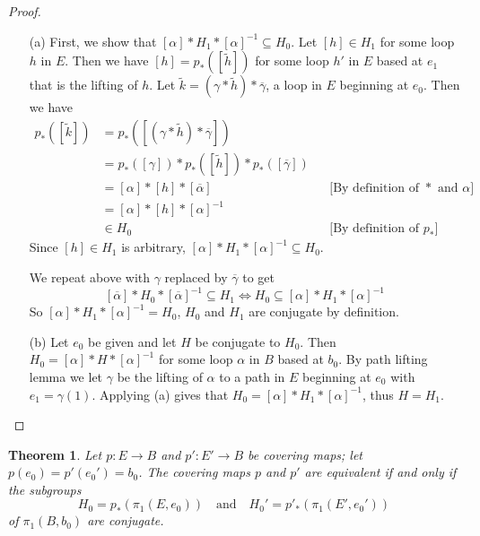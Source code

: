 \documentclass{amsart}
\newtheorem{theorem}{Theorem}[section]
\theoremstyle{definition}
\theoremstyle{remark}
\numberwithin{equation}{section}
\begin{document}
\begin{proof}\mbox{}
\begin{enumerate}
    \item[(a)] First, we show that $[\alpha] \ast H_1 \ast [\alpha]^{-1} \subseteq H_0$. Let $[h] \in H_1$ for some loop $h$ in $E$. Then we have $[h] = p_\ast([\tilde{h}])$ for some loop $h'$ in $E$ based at $e_1$ that is the lifting of $h$. Let $\tilde{k} = (\gamma \ast \tilde{h}) \ast \overline{\gamma}$, a loop in $E$ beginning at $e_0$. Then we have
    \begin{align*}
        p_\ast([\tilde{k}]) &= p_\ast([(\gamma \ast \tilde{h}) \ast \overline{\gamma}])\\
                            &= p_\ast([\gamma]) \ast p_\ast([\tilde{h}]) \ast p_\ast([\overline{\gamma}])\\
                            &= [\alpha] \ast [h] \ast [\overline{\alpha}]&& \text{[By definition of $\ast$ and $\alpha$]}\\
                            &= [\alpha] \ast [h] \ast [\alpha]^{-1}\\
                            &\in H_0 && \text{[By definition of $p_\ast$]}
    \end{align*}
Since $[h] \in H_1$ is arbitrary, $[\alpha] \ast H_1 \ast [\alpha]^{-1} \subseteq H_0$.

\noindent We repeat above with $\gamma$ replaced by $\overline{\gamma}$ to get $$[\overline{\alpha}] \ast H_0 \ast [\overline{\alpha}]^{-1} \subseteq H_1 \iff H_0 \subseteq [\alpha] \ast H_1 \ast [\alpha]^{-1}$$
So $[\alpha] \ast H_1 \ast [\alpha]^{-1} = H_0$, $H_0$ and $H_1$ are conjugate by definition.

\item[(b)] Let $e_0$ be given and let $H$ be conjugate to $H_0$. Then $H_0 = [\alpha] \ast H \ast [\alpha]^{-1}$ for some loop $\alpha$ in $B$ based at $b_0$. By path lifting lemma we let $\gamma$ be the lifting of $\alpha$ to a path in $E$ beginning at $e_0$ with $e_1 = \gamma(1)$. Applying (a) gives that $H_0 = [\alpha] \ast H_1 \ast [\alpha]^{-1}$, thus $H = H_1$.
\end{enumerate}
\end{proof}

\begin{theorem} \label{equiv cov}Let $p : E \to B$ and $p' : E' \to B$ be covering maps; let $p(e_0) = p'(e_0') = b_0$. The covering maps $p$ and $p'$ are equivalent if and only if the subgroups
\[
H_0 = p_\ast(\pi_1(E, e_0)) \quad \text{and} \quad H_0' = p'_\ast(\pi_1(E', e_0'))
\]
of $\pi_1(B, b_0)$ are conjugate.
\end{theorem}
\end{document}
